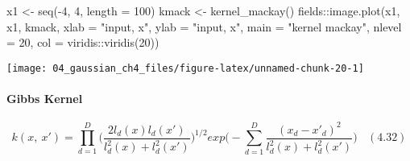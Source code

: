 \documentclass[
]{article}
\newenvironment{Shaded}{\begin{snugshade}}{\end{snugshade}}
\newcommand{\AttributeTok}[1]{\textcolor[rgb]{0.77,0.63,0.00}{#1}}
\newcommand{\DecValTok}[1]{\textcolor[rgb]{0.00,0.00,0.81}{#1}}
\newcommand{\FunctionTok}[1]{\textcolor[rgb]{0.00,0.00,0.00}{#1}}
\newcommand{\NormalTok}[1]{#1}
\newcommand{\OtherTok}[1]{\textcolor[rgb]{0.56,0.35,0.01}{#1}}
\newcommand{\SpecialCharTok}[1]{\textcolor[rgb]{0.00,0.00,0.00}{#1}}
\newcommand{\StringTok}[1]{\textcolor[rgb]{0.31,0.60,0.02}{#1}}
\begin{document}
\begin{Shaded}
\begin{Highlighting}[]
\NormalTok{x1 }\OtherTok{\textless{}{-}} \FunctionTok{seq}\NormalTok{(}\SpecialCharTok{{-}}\DecValTok{4}\NormalTok{, }\DecValTok{4}\NormalTok{, }\AttributeTok{length =} \DecValTok{100}\NormalTok{)}
\NormalTok{kmack }\OtherTok{\textless{}{-}} \FunctionTok{kernel\_mackay}\NormalTok{()}
\NormalTok{fields}\SpecialCharTok{::}\FunctionTok{image.plot}\NormalTok{(x1, x1, kmack,}
\AttributeTok{xlab =} \StringTok{"input, x"}\NormalTok{,}
\AttributeTok{ylab =} \StringTok{"input, x\textquotesingle{}"}\NormalTok{,}
\AttributeTok{main =} \StringTok{"kernel mackay"}\NormalTok{,}
\AttributeTok{nlevel =} \DecValTok{20}\NormalTok{,}
\AttributeTok{col =}\NormalTok{ viridis}\SpecialCharTok{::}\FunctionTok{viridis}\NormalTok{(}\DecValTok{20}\NormalTok{))}
\end{Highlighting}
\end{Shaded}

\begin{center}\texttt{[image: 04\_gaussian\_ch4\_files/figure-latex/unnamed-chunk-20-1]} \end{center}

\hypertarget{gibbs-kernel}{%
\paragraph{Gibbs Kernel}\label{gibbs-kernel}}

\[
k(x,\ x') = \prod ^D_{d=1}\Big(\frac {2l_d(x)l_d(x')}
{l_d^2(x) +  l_d^2(x')}\Big)^ {1/2}
exp \Big(- \sum_{d=1}^D \frac {(x_d - x'_d)^2} {l_d^2(x) + l_d^2(x')}\Big)\ \ \ \ (4.32)
\]
\end{document}
